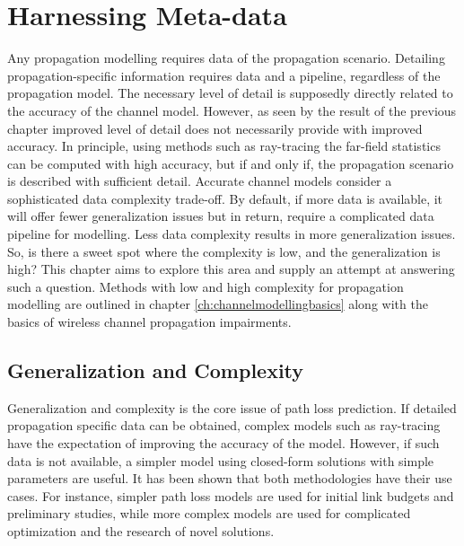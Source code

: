 \chapter{Harnessing Meta-data}\label{ch:satelliteImages}

Any propagation modelling requires data of the propagation scenario. Detailing propagation-specific information requires data and a pipeline, regardless of the propagation model. The necessary level of detail is supposedly directly related to the accuracy of the channel model. However, as seen by the result of the previous chapter improved level of detail does not necessarily provide with improved accuracy. In principle, using methods such as ray-tracing the far-field statistics can be computed with high accuracy, but if and only if, the propagation scenario is described with sufficient detail. Accurate channel models consider a sophisticated data complexity trade-off. By default, if more data is available, it will offer fewer generalization issues but in return, require a complicated data pipeline for modelling. Less data complexity results in more generalization issues. So, is there a sweet spot where the complexity is low, and the generalization is high? This chapter aims to explore this area and supply an attempt at answering such a question. Methods with low and high complexity for propagation modelling are outlined in chapter \ref{ch:channelmodellingbasics} along with the basics of wireless channel propagation impairments. 


\section{Generalization and Complexity \label{sec:generalization}}
Generalization and complexity is the core issue of path loss prediction. If detailed propagation specific data can be obtained, complex models such as ray-tracing have the expectation of improving the accuracy of the model. However, if such data is not available, a simpler model using closed-form solutions with simple parameters are useful. It has been shown that both methodologies have their use cases. For instance, simpler path loss models are used for initial link budgets and preliminary studies, while more complex models are used for complicated optimization and the research of novel solutions.


